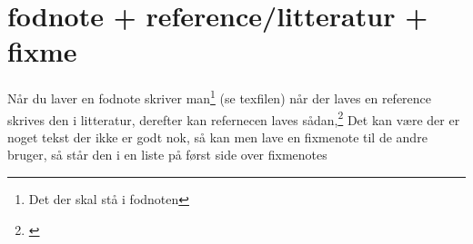 \begin{usecase}




\end{usecase}



\section{fodnote + reference/litteratur + fixme}
Når du laver en fodnote skriver man\footnote{Det der skal stå i fodnoten} (se texfilen)
\newline\newline
når der laves en reference skrives den i litteratur, derefter kan refernecen laves sådan,\footnote{\citep[ s. 13]{mti:AN236}}
\newline\newline
Det kan være der er noget tekst der ikke er godt nok, så kan men lave en fixmenote til de andre bruger, så står den i en liste på først side over fixmenotes

\begingroup
	\raggedright
	\nocite{*}
	
\endgroup

